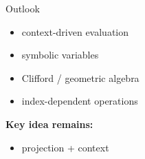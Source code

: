 \documentclass{beamer}
\begin{document}

\begin{frame}{Outlook}

\begin{itemize}
\item context-driven evaluation
\item symbolic variables
\item Clifford / geometric algebra
\item index-dependent operations
\end{itemize}

\vspace{1em}

\textbf{Key idea remains:}

\begin{itemize}
\item projection + context
\end{itemize}

\end{frame}
\end{document}
